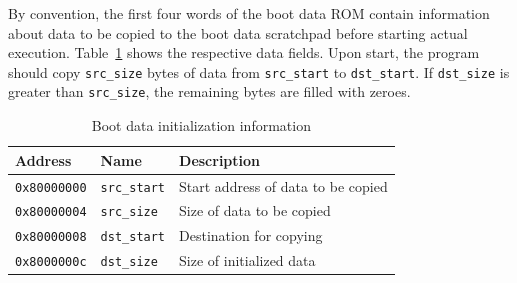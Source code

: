 \documentclass[a4paper,fontsize=10pt,twoside,DIV15,BCOR12mm,headinclude=true,footinclude=false,pagesize,bibtotoc]{scrbook}
\newcommand{\code}[1]{{\texttt{#1}}}
\newcommand{\comment}[3]{

\textsf{\textbf{#1}} {\color{#3}#2}}
\newcommand{\stefan}[1]{\comment{Stefan}{#1}{RoyalPurple}}
\renewcommand{\stefan}[1]{}
\begin{document}
By convention, the first four words of the boot data ROM contain
information about data to be copied to the boot data scratchpad before
starting actual execution. Table~\ref{tab:bootrommap} shows the
respective data fields. Upon start, the program should copy
\code{src\_size} bytes of data from \code{src\_start} to
\code{dst\_start}. If \code{dst\_size} is greater than
\code{src\_size}, the remaining bytes are filled with zeroes.

\begin{table}
\centering
\begin{tabular}{lll}
\toprule
Address & Name & Description \\
\midrule
\code{0x80000000} & \code{src\_start} & Start address of data to be copied \\
\code{0x80000004} & \code{src\_size} & Size of data to be copied \\
\code{0x80000008} & \code{dst\_start} & Destination for copying \\
\code{0x8000000c} & \code{dst\_size} & Size of initialized data \\
\bottomrule
\end{tabular}
\caption{Boot data initialization information}
\label{tab:bootrommap}
\end{table}


\stefan{We discussed about making the stack cache memory mapped, like the SPM. The disadvantage is that
we need to reserve an additional register for the stack pointer of the stack cache. s5 (the stack cache spill pointer) must point into a main
memory address range. s6 (the stack top pointer) must point to the top of the stack cache in the cache address range and must be modifiable
(for context switching). An additional s7 must either contain the size of the stack cache or the tail pointer of the stack cache.

The advantage is we can then pass typed pointers to functions, similar to SPM pointers, if the caller stack frame is not evicted, in a first
step. As a second step, we can drop the typed loads and use the compiler to emit address range information to the WCET analysis.
A pointer into the stack cache address range is always guaranteed to be a hit (accessing an address that has been evicted is an error). We
can therefore get rid of function duplication depending on their pointer types. We basically move the information about the accessed memory from the
memory instruction to the pointer value, which can be context-sensitive.}

\end{document}
